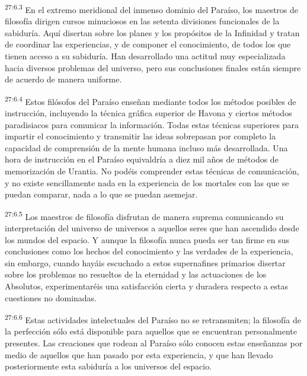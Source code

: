 \par
\textsuperscript{27:6.3} En el extremo meridional del inmenso dominio del Paraíso, los maestros de filosofía dirigen cursos minuciosos en las setenta divisiones funcionales de la sabiduría. Aquí disertan sobre los planes y los propósitos de la Infinidad y tratan de coordinar las experiencias, y de componer el conocimiento, de todos los que tienen acceso a su sabiduría. Han desarrollado una actitud muy especializada hacia diversos problemas del universo, pero sus conclusiones finales están siempre de acuerdo de manera uniforme.

\par
\textsuperscript{27:6.4} Estos filósofos del Paraíso enseñan mediante todos los métodos posibles de instrucción, incluyendo la técnica gráfica superior de Havona y ciertos métodos paradisiacos para comunicar la información. Todas estas técnicas superiores para impartir el conocimiento y transmitir las ideas sobrepasan por completo la capacidad de comprensión de la mente humana incluso más desarrollada. Una hora de instrucción en el Paraíso equivaldría a diez mil años de métodos de memorización de Urantia. No podéis comprender estas técnicas de comunicación, y no existe sencillamente nada en la experiencia de los mortales con las que se puedan comparar, nada a lo que se puedan asemejar.

\par
\textsuperscript{27:6.5} Los maestros de filosofía disfrutan de manera suprema comunicando su interpretación del universo de universos a aquellos seres que han ascendido desde los mundos del espacio. Y aunque la filosofía nunca pueda ser tan firme en sus conclusiones como los hechos del conocimiento y las verdades de la experiencia, sin embargo, cuando hayáis escuchado a estos supernafines primarios disertar sobre los problemas no resueltos de la eternidad y las actuaciones de los Absolutos, experimentaréis una satisfacción cierta y duradera respecto a estas cuestiones no dominadas.

\par
\textsuperscript{27:6.6} Estas actividades intelectuales del Paraíso no se retransmiten; la filosofía de la perfección sólo está disponible para aquellos que se encuentran personalmente presentes. Las creaciones que rodean al Paraíso sólo conocen estas enseñanzas por medio de aquellos que han pasado por esta experiencia, y que han llevado posteriormente esta sabiduría a los universos del espacio.

